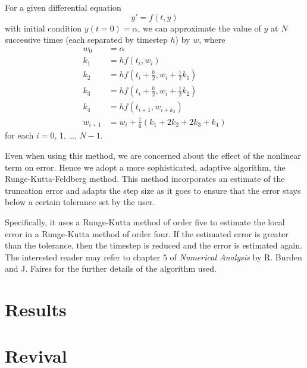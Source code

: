 \documentclass[a4paper, 10pt]{article}
\theoremstyle{plain}
\begin{document}
For a given differential equation
\begin{equation}
    y' = f(t,y)
\end{equation}
with initial condition $y(t=0) = \alpha$, we can approximate the value of $y$ at
$N$ successive times (each separated by timestep $h$) by $w$, where
\begin{align*}
    w_{0}   &= \alpha
    \\
    k_{1}   &= hf(t_{i}, w_{i})
    \\
    k_{2}   &= hf \left( t_{i} + \frac{h}{2}, w_{i} + \frac{1}{2} k_{1} \right)
    \\
    k_{3}   &= hf \left( t_{i} + \frac{h}{2}, w_i+\frac{1}{2} k_{2} \right)
    \\
    k_{4}   &= hf (t_{i+1}, w_{i+k_{3}})
    \\
    w_{i+1} &= w_{i} + \frac{1}{6}(k_{1} + 2 k_{2} + 2 k_{3} + k_{4})
\end{align*}
for each $i = 0$, 1, \dots, $N-1$.

Even when using this method, we are concerned about the effect of the nonlinear
term on error. Hence we adopt a more sophisticated, adaptive algorithm, the
Runge-Kutta-Feldberg method. This method incorporates an estimate of the
truncation error and adapts the step size as it goes to ensure that the error
stays below a certain tolerance set by the user.

Specifically, it uses a Runge-Kutta method of order five to estimate the
local error in a Runge-Kutta method of order four. If the estimated error
is greater than the tolerance, then the timestep is reduced and the error is
estimated again. The interested reader may refer to chapter $5$ of
\emph{Numerical Analysis} by R. Burden and J. Faires \cite{Burden2005} for the
further details of the algorithm used.
\newpage


\section{Results}

\section{Revival \label{revival}}
\end{document}
